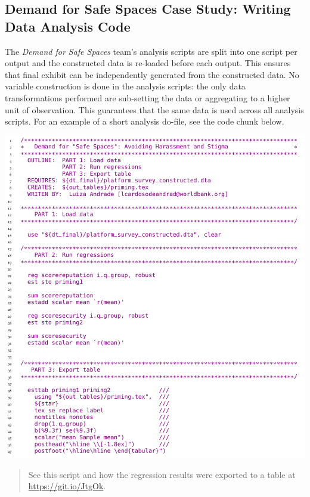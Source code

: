 \documentclass[
]{book}
\begin{document}
\begin{ex}
\hypertarget{demand-for-safe-spaces-case-study-writing-data-analysis-code}{%
\subsection{Demand for Safe Spaces Case Study: Writing Data Analysis Code}\label{demand-for-safe-spaces-case-study-writing-data-analysis-code}}

The \emph{Demand for Safe Spaces} team's analysis scripts are split into one script per output and the constructed data is re-loaded before each output. This ensures that final exhibit can be independently generated from the constructed data. No variable construction is done in the analysis scripts: the only data transformations performed are sub-setting the data or aggregating to a higher unit of observation. This guarantees that the same data is used across all analysis scripts. For an example of a short analysis do-file, see the code chunk below.

\includegraphics{examples/ch6-writing-data-analysis-code.png}

\begin{quote}
See this script and how the regression results were exported to a table at \url{https://git.io/JtgOk}.
\end{quote}
\end{ex}
\end{document}
